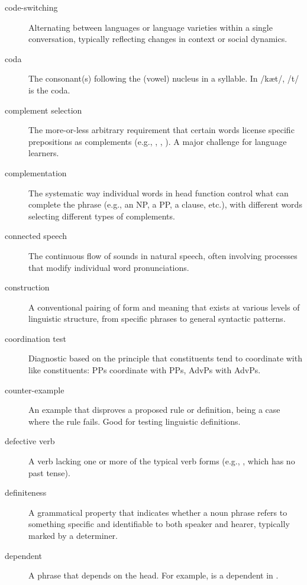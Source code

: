\begin{description}
\item[code-switching] Alternating between languages or language varieties within a single conversation, typically reflecting changes in context or social dynamics.

\item[coda] The consonant(s) following the (vowel) nucleus in a syllable. In  /k\ae t/, /t/ is the coda.

\item[complement selection] The more-or-less arbitrary requirement that certain words license specific prepositions as complements (e.g., , , ). A major challenge for language learners.

\item[complementation] The systematic way individual words in head function control what can complete the phrase (e.g., an NP, a PP, a clause, etc.), with different words selecting different types of complements.

\item[connected speech] The continuous flow of sounds in natural speech, often involving processes that modify individual word pronunciations.

\item[construction] A conventional pairing of form and meaning that exists at various levels of linguistic structure, from specific phrases to general syntactic patterns.

\item[coordination test] Diagnostic based on the principle that constituents tend to coordinate with like constituents: PPs coordinate with PPs, AdvPs with AdvPs.

\item[counter-example] An example that disproves a proposed rule or definition, being a case where the rule fails. Good for testing linguistic definitions.

\item[defective verb] A verb lacking one or more of the typical verb forms (e.g., , which has no past tense).

\item[definiteness] A grammatical property that indicates whether a noun phrase refers to something specific and identifiable to both speaker and hearer, typically marked by a determiner.

\item[dependent] A phrase that depends on the head. For example,  is a dependent in .


\end{description}
